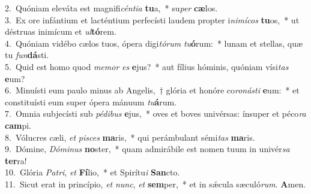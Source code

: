 {2.~}Quóniam eleváta est magnifi\textit{cén}\textit{ti}\textit{a} \textbf{tu}a,~* su\textit{per} \textbf{cæ}los.\\
{3.~}Ex ore infántium et lacténtium perfecísti laudem propter i\textit{ni}\textit{mí}\textit{cos} \textbf{tu}os,~* ut déstruas inimícum et \textit{ul}\textbf{tó}rem.\\
{4.~}Quóniam vidébo cælos tuos, ópera digi\textit{tó}\textit{rum} \textit{tu}\textbf{ó}rum:~* lunam et stellas, quæ tu \textit{fun}\textbf{dá}sti.\\
{5.~}Quid est homo quod \textit{me}\textit{mor} \textit{es} \textbf{e}jus?~* aut fílius hóminis, quóniam vísi\textit{tas} \textbf{e}um?\\
{6.~}Minuísti eum paulo minus ab Angelis,~† glória et honóre co\textit{ro}\textit{ná}\textit{sti} \textbf{e}um:~* et constituísti eum super ópera mánuum \textit{tu}\textbf{á}rum.\\
{7.~}Omnia subjecísti sub \textit{pé}\textit{di}\textit{bus} \textbf{e}jus,~* oves et boves univérsas: ínsuper et péco\textit{ra} \textbf{cam}pi.\\
{8.~}Vólucres cæli, \textit{et} \textit{pi}\textit{sces} \textbf{ma}ris,~* qui perámbulant sémi\textit{tas} \textbf{ma}ris.\\
{9.~}Dómine, \textit{Dó}\textit{mi}\textit{nus} \textbf{no}ster,~* quam admirábile est nomen tuum in univér\textit{sa} \textbf{ter}ra!\\
{10.~}Glória \textit{Pa}\textit{tri}, \textit{et} \textbf{Fí}lio,~* et Spirítu\textit{i} \textbf{San}cto.\\
{11.~}Sicut erat in princípio, \textit{et} \textit{nunc}, \textit{et} \textbf{sem}per,~* et in sǽcula sæculó\textit{rum}. \textbf{A}men.\\
